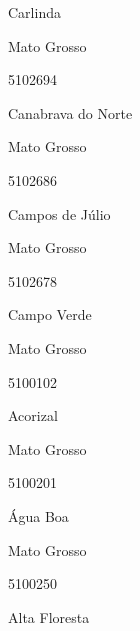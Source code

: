 \documentclass[
  letterpaper,
]{report}
\begin{document}
\n      

Carlinda

\n    

\n    

\n      

Mato Grosso

\n      

5102694

\n      

Canabrava do Norte

\n    

\n    

\n      

Mato Grosso

\n      

5102686

\n      

Campos de Júlio

\n    

\n    

\n      

Mato Grosso

\n      

5102678

\n      

Campo Verde

\n    

\n    

\n      

Mato Grosso

\n      

5100102

\n      

Acorizal

\n    

\n    

\n      

Mato Grosso

\n      

5100201

\n      

Água Boa

\n    

\n    

\n      

Mato Grosso

\n      

5100250

\n      

Alta Floresta

\n    

\n    
\end{document}
